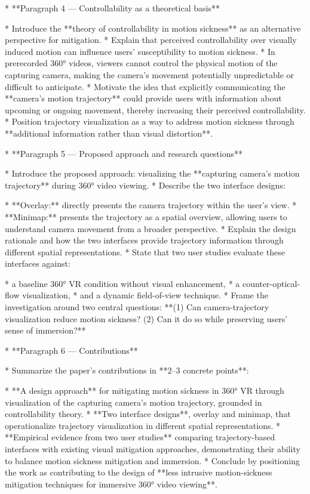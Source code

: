 * **Paragraph 4 — Controllability as a theoretical basis**

  * Introduce the **theory of controllability in motion sickness** as an alternative perspective for mitigation.
  * Explain that perceived controllability over visually induced motion can influence users' susceptibility to motion sickness.
  * In prerecorded 360° videos, viewers cannot control the physical motion of the capturing camera, making the camera's movement potentially unpredictable or difficult to anticipate.
  * Motivate the idea that explicitly communicating the **camera's motion trajectory** could provide users with information about upcoming or ongoing movement, thereby increasing their perceived controllability.
  * Position trajectory visualization as a way to address motion sickness through **additional information rather than visual distortion**.

* **Paragraph 5 — Proposed approach and research questions**

  * Introduce the proposed approach: visualizing the **capturing camera's motion trajectory** during 360° video viewing.
  * Describe the two interface designs:

    * **Overlay:** directly presents the camera trajectory within the user's view.
    * **Minimap:** presents the trajectory as a spatial overview, allowing users to understand camera movement from a broader perspective.
  * Explain the design rationale and how the two interfaces provide trajectory information through different spatial representations.
  * State that two user studies evaluate these interfaces against:

    * a baseline 360° VR condition without visual enhancement,
    * a counter-optical-flow visualization,
    * and a dynamic field-of-view technique.
  * Frame the investigation around two central questions: **(1) Can camera-trajectory visualization reduce motion sickness? (2) Can it do so while preserving users' sense of immersion?**

* **Paragraph 6 — Contributions**

  * Summarize the paper's contributions in **2–3 concrete points**:

    * **A design approach** for mitigating motion sickness in 360° VR through visualization of the capturing camera's motion trajectory, grounded in controllability theory.
    * **Two interface designs**, overlay and minimap, that operationalize trajectory visualization in different spatial representations.
    * **Empirical evidence from two user studies** comparing trajectory-based interfaces with existing visual mitigation approaches, demonstrating their ability to balance motion sickness mitigation and immersion.
  * Conclude by positioning the work as contributing to the design of **less intrusive motion-sickness mitigation techniques for immersive 360° video viewing**.
